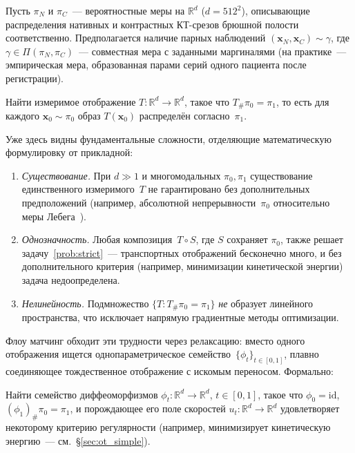Пусть $\pi_N$ и $\pi_C$~--- вероятностные меры на $\mathbb{R}^d$ ($d=512^2$), описывающие распределения нативных и контрастных КТ-срезов брюшной полости соответственно. Предполагается наличие парных наблюдений $(\mathbf{x}_N,\mathbf{x}_C)\sim\gamma$, где $\gamma\in\Pi(\pi_N,\pi_C)$~--- совместная мера с заданными маргиналями (на практике~--- эмпирическая мера, образованная парами серий одного пациента после регистрации).

\begin{problem}
\label{prob:strict}
Найти измеримое отображение $T:\mathbb{R}^d\to\mathbb{R}^d$, такое что $T_{\#}\pi_0 = \pi_1$, то есть для каждого $\mathbf{x}_0\sim\pi_0$ образ $T(\mathbf{x}_0)$ распределён согласно~$\pi_1$.
\end{problem}

Уже здесь видны фундаментальные сложности, отделяющие математическую формулировку от прикладной:
\begin{enumerate}
    \item \emph{Существование.} При $d\gg 1$ и многомодальных $\pi_0,\pi_1$ существование единственного измеримого~$T$ не гарантировано без дополнительных предположений (например, абсолютной непрерывности~$\pi_0$ относительно меры Лебега~\cite{brenier1991polar}).
    \item \emph{Однозначность.} Любая композиция~$T\circ S$, где $S$ сохраняет $\pi_0$, также решает задачу~\ref{prob:strict}~--- транспортных отображений бесконечно много, и без дополнительного критерия (например, минимизации кинетической энергии) задача недоопределена.
    \item \emph{Нелинейность.} Подмножество $\{T : T_{\#}\pi_0=\pi_1\}$ \emph{не} образует линейного пространства, что исключает напрямую градиентные методы оптимизации.
\end{enumerate}

Флоу матчинг обходит эти трудности через релаксацию: вместо одного отображения ищется однопараметрическое семейство~$\{\phi_t\}_{t\in[0,1]}$, плавно соединяющее тождественное отображение с искомым переносом. Формально:

\begin{problem}
\label{prob:dynamic}
Найти семейство диффеоморфизмов $\phi_t:\mathbb{R}^d\to\mathbb{R}^d$, $t\in[0,1]$, такое что $\phi_0=\mathrm{id}$, $(\phi_1)_{\#}\pi_0 = \pi_1$, и порождающее его поле скоростей $u_t:\mathbb{R}^d\to\mathbb{R}^d$ удовлетворяет некоторому критерию регулярности (например, минимизирует кинетическую энергию~--- см.~\S\ref{sec:ot_simple}).
\end{problem}

